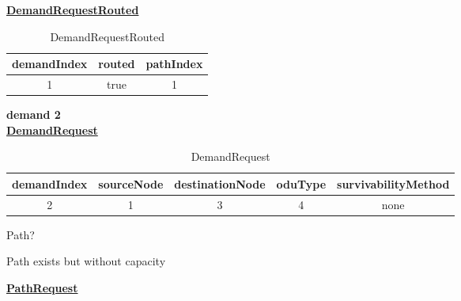 \underline{\textbf{DemandRequestRouted}}

\begin{table}[H]
	\centering
	\begin{tabular}{| c | c | c |}
		\hline
		\textbf{demandIndex} & \textbf{routed}  & \textbf{pathIndex}\\ \hline
		1                    & true             & 1                 \\ \hline
	\end{tabular}
	\caption{DemandRequestRouted}
	\label{demand_request_routed}
\end{table}

\textbf{demand 2}\\

\underline{\textbf{DemandRequest}}

\begin{table}[H]
	\centering
	\begin{tabular}{| c | c | c | c | c |}
		\hline
		\textbf{demandIndex} & \textbf{sourceNode} & \textbf{destinationNode} & \textbf{oduType} & \textbf{survivabilityMethod}\\ \hline
		 2                   & 1                   & 3                        & 4                & none						   \\ \hline
	\end{tabular}
	\caption{DemandRequest}
	\label{demand_request}
\end{table}

Path?\\

\begin{table}[H]
	\centering
	\caption{paths}
	\label{paths}
\end{table}

Path exists but without capacity

\underline{\textbf{PathRequest}}

